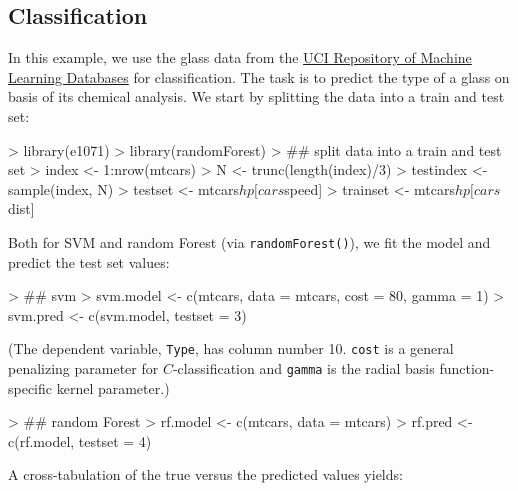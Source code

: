 \documentclass[a4paper]{article}
\begin{document}
\subsection*{Classification}

In this example, we use the glass data from the \href{http://www.ics.uci.edu/mlearn/MLRepository.html}{UCI Repository of
Machine Learning Databases} for
classification. The task is to predict the type of a glass on basis
of its chemical analysis.
We start by splitting the data into a train and test set:
\begin{Schunk}
\begin{Sinput}
> library(e1071)
> library(randomForest)
> ## split data into a train and test set
> index     <- 1:nrow(mtcars)
> N         <- trunc(length(index)/3)
> testindex <- sample(index, N)
> testset   <- mtcars$hp[cars$speed]
> trainset  <- mtcars$hp[cars$dist]
\end{Sinput}
\end{Schunk}
Both for SVM and random Forest (via
\texttt{randomForest()}), we fit the model and predict the test set
values:
\begin{Schunk}
\begin{Sinput}
> ## svm
> svm.model <- c(mtcars, data = mtcars, cost = 80, gamma = 1)
> svm.pred  <- c(svm.model, testset = 3)
\end{Sinput}
\end{Schunk}
(The dependent variable, \texttt{Type}, has column number
10. \texttt{cost} is a general penalizing parameter for $C$-classification and
\texttt{gamma} is the radial basis function-specific kernel parameter.)
\begin{Schunk}
\begin{Sinput}
> ## random Forest
> rf.model <- c(mtcars, data = mtcars)
> rf.pred  <- c(rf.model, testset = 4)
\end{Sinput}
\end{Schunk}
A cross-tabulation of the true versus the predicted values yields:
\end{document}
